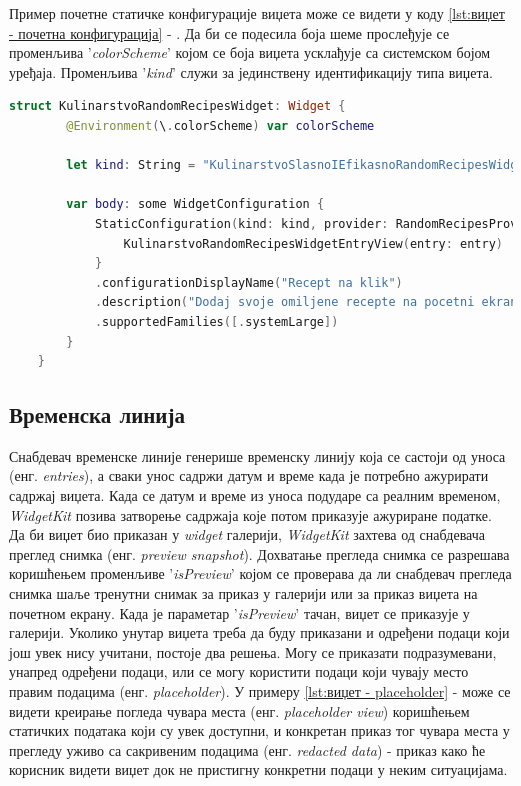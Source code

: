 \documentclass[12pt,oneside]{memoir}
\begin{document}
\indent Пример почетне статичке конфигурације виџета може се видети у коду \ref{lst:виџет - почетна конфигурација} - . Да би се подесила боја шеме прослеђује се променљива '\textit{colorScheme}' којом се боја виџета усклађује са системском бојом уређаја. Променљива '\textit{kind}' служи за јединствену идентификацију типа виџета. 

\begin{lstlisting}[caption=\textit{{Виџет --- почетна конфигурација}}, label={lst:виџет - почетна конфигурација}, language=Swift, frame=single]
    struct KulinarstvoRandomRecipesWidget: Widget {
        @Environment(\.colorScheme) var colorScheme
        
        let kind: String = "KulinarstvoSlasnoIEfikasnoRandomRecipesWidget"
        
        var body: some WidgetConfiguration {
            StaticConfiguration(kind: kind, provider: RandomRecipesProvider()) { entry in
                KulinarstvoRandomRecipesWidgetEntryView(entry: entry)
            }
            .configurationDisplayName("Recept na klik")
            .description("Dodaj svoje omiljene recepte na pocetni ekran")
            .supportedFamilies([.systemLarge])
        }
    }
\end{lstlisting}

\subsection{Временска линија}
\label{subsec:Временска линија}
\indent Снабдевач временске линије генерише временску линију која се састоји од уноса (енг. \textit{entries}), а сваки унос садржи датум и време када је потребно ажурирати садржај виџета. Када се датум и време из уноса подударе са реалним временом, \textit{WidgetKit} позива затворење садржаја које потом приказује ажуриране податке. 
\\
\indent Да би виџет био приказан у \textit{widget} галерији, \textit{WidgetKit} захтева од снабдевача преглед снимка (енг. \textit{preview snapshot}). Дохватање прегледа снимка се разрешава коришћењем променљиве '\textit{isPreview}' којом се проверава да ли снабдевач прегледа снимка шаље тренутни снимак за приказ у галерији или за приказ виџета на почетном екрану. Када је параметар '\textit{isPreview}' тачан, виџет се приказује у галерији. Уколико унутар виџета треба да буду приказани и одређени подаци који још увек нису учитани, постоје два решења. Могу се приказати подразумевани, унапред одређени подаци, или се могу користити подаци који чувају место правим подацима (енг. \textit{placeholder}). У примеру \ref{lst:виџет - placeholder} -  може се видети креирање погледа чувара места (енг. \textit{placeholder view}) коришћењем статичких података који су увек доступни, и конкретан приказ тог чувара места у прегледу уживо са сакривеним подацима (енг. \textit{redacted data}) - приказ како ће корисник видети виџет док не пристигну конкретни подаци у неким ситуацијама.
\end{document}
